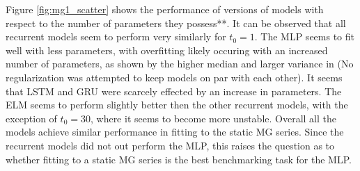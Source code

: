\documentclass[11pt]{article}
\begin{document}
  Figure \ref{fig:mg1_scatter} shows the performance of versions of models with
  respect to the number of parameters they possess**. It can be observed
  that all recurrent models seem to perform very similarly for $t_0 =
  1$. The MLP seems to fit well with less parameters, with overfitting
  likely occuring with an increased number of parameters, as shown 
  by the higher median and larger variance in (No
  regularization was attempted to keep models on par with each
  other). It seems that LSTM and GRU were scarcely effected by an
  increase in parameters. The ELM seems to perform slightly better
  then the other recurrent models, with the exception of $t_0 = 30$, where it seems to
  become more unstable. Overall all the models achieve similar
  performance in fitting to the static MG series. Since the recurrent
  models did not out perform the MLP, this raises the question as to
  whether fitting to a static MG series is the best benchmarking task
  for the MLP. %
\end{document}
